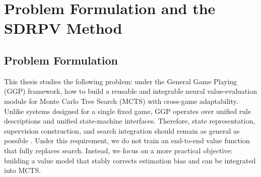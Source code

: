 

\chapter{Problem Formulation and the SDRPV Method}
\setcounter{figure}{0}
\setcounter{equation}{0}
\renewcommand{\thefigure}{\thechapter-\arabic{figure}}
\renewcommand{\theequation}{\thechapter-\arabic{equation}}


\section{Problem Formulation}


This thesis studies the following problem: under the General Game Playing (GGP) framework, how to build a reusable and integrable neural value-evaluation module for Monte Carlo Tree Search (MCTS) with cross-game adaptability. Unlike systems designed for a single fixed game, GGP operates over unified rule descriptions and unified state-machine interfaces. Therefore, state representation, supervision construction, and search integration should remain as general as possible \cite{genesereth2005general,browne2012survey}. Under this requirement, we do not train an end-to-end value function that fully replaces search. Instead, we focus on a more practical objective: building a value model that stably corrects estimation bias and can be integrated into MCTS.


